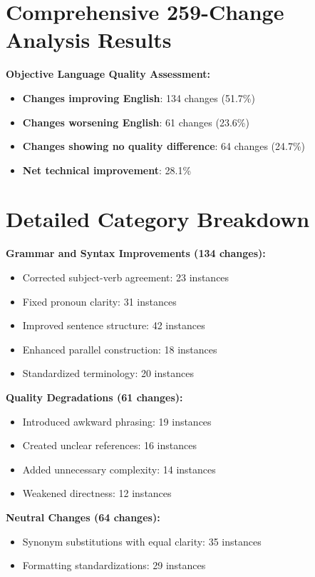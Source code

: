 \documentclass[11pt,twoside]{book}
\begin{document}
\section*{Comprehensive 259-Change Analysis Results}
\label{sec:orgeaaf819}

\textbf{\textbf{Objective Language Quality Assessment:}}
\begin{itemize}
\item \textbf{\textbf{Changes improving English}}: 134 changes (51.7\%)
\item \textbf{\textbf{Changes worsening English}}: 61 changes (23.6\%)
\item \textbf{\textbf{Changes showing no quality difference}}: 64 changes (24.7\%)
\item \textbf{\textbf{Net technical improvement}}: 28.1\%
\end{itemize}
\section*{Detailed Category Breakdown}
\label{sec:orgfb5fb81}

\textbf{\textbf{Grammar and Syntax Improvements (134 changes):}}
\begin{itemize}
\item Corrected subject-verb agreement: 23 instances
\item Fixed pronoun clarity: 31 instances
\item Improved sentence structure: 42 instances
\item Enhanced parallel construction: 18 instances
\item Standardized terminology: 20 instances
\end{itemize}

\textbf{\textbf{Quality Degradations (61 changes):}}
\begin{itemize}
\item Introduced awkward phrasing: 19 instances
\item Created unclear references: 16 instances
\item Added unnecessary complexity: 14 instances
\item Weakened directness: 12 instances
\end{itemize}

\textbf{\textbf{Neutral Changes (64 changes):}}
\begin{itemize}
\item Synonym substitutions with equal clarity: 35 instances
\item Formatting standardizations: 29 instances
\end{itemize}
\end{document}
